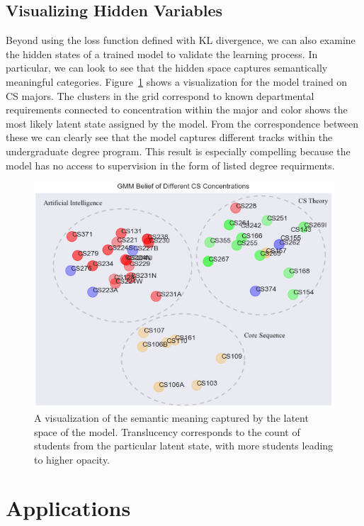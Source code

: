 \documentclass{edm_template}
\begin{document}
\subsection{Visualizing Hidden Variables}

Beyond using the loss function defined with KL divergence, we can also examine the hidden states of a trained model to validate the learning process. In particular, we can look to see that the hidden space captures semantically meaningful categories. Figure~\ref{fig:gmm_clusters} shows a visualization for the model trained on CS majors. The clusters in the grid correspond to known departmental requirements connected to concentration within the major and color shows the most likely latent state assigned by the model. From the correspondence between these we can clearly see that the model captures different tracks within the undergraduate degree program. This result is especially compelling because the model has no access to supervision in the form of listed degree requirments.

\begin{figure}[h]
    \centering
    \includegraphics[scale=0.5]{figures/gmm_clusters.png}
    \caption{A visualization of the semantic meaning captured by the latent space of the model. Translucency corresponds to the count of students from the particular latent state, with more students leading to higher opacity.}
    \label{fig:gmm_clusters}
\end{figure}

\section{Applications}
\end{document}
